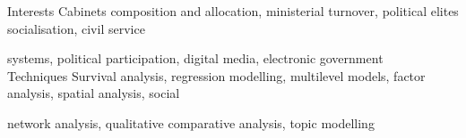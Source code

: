 





\begin{cvskills}

\cvskill
{Interests}
{Cabinets composition and allocation, ministerial turnover, political elites socialisation, civil service}

\cvskill
{}
{systems, political participation, digital media, electronic government}\\

\cvskill
{Techniques} 
{Survival analysis, regression modelling, multilevel models, factor analysis, spatial analysis, social}

\cvskill
{} 
{network analysis, qualitative comparative analysis, topic modelling} \\

\end{cvskills}
